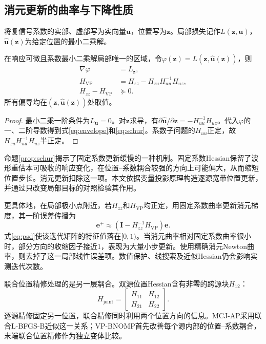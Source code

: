 \subsection{消元更新的曲率与下降性质}\label{sec:curvature}
将复信号系数的实部、虚部写为实向量$\bm u$，位置写为$\bm z$。局部损失记作$L(\bm z,\bm u)$，$\widehat{\bm u}(\bm z)$为给定位置的最小二乘解。
\begin{proposition}[消元曲率]\label{prop:schur}
在响应可微且系数最小二乘解局部唯一的区域，令$\varphi(\bm z)=L(\bm z,\widehat{\bm u}(\bm z))$，则
\begin{align}
 \nabla\varphi&=L_{\bm z},\label{eq:envelope}\\
 H_{\mathrm{VP}}&=H_{zz}-H_{zu}H_{uu}^{-1}H_{uz},\label{eq:schur}\\
 H_{zz}-H_{\mathrm{VP}}&\succeq0 .\label{eq:psd}
\end{align}
所有偏导均在$(\bm z,\widehat{\bm u}(\bm z))$处取值。
\end{proposition}
\begin{proof}
最小二乘一阶条件为$L_{\bm u}=0$。对$\bm z$求导，有$\partial\widehat{\bm u}/\partial\bm z=-H_{uu}^{-1}H_{uz}$。代入$\varphi$的一、二阶导数得到式\eqref{eq:envelope}和\eqref{eq:schur}。系数子问题的$H_{uu}$正定，故$H_{zu}H_{uu}^{-1}H_{uz}$半正定。
\end{proof}

命题\ref{prop:schur}揭示了固定系数更新缓慢的一种机制。固定系数Hessian保留了波形重估本可吸收的响应变化，在位置--系数耦合较强的方向上可能偏大，从而缩短位置步长。消元更新扣除这一项。本文依据变量投影原理\cite{GolubPereyra1973}构造逐源宽带位置更新，并通过只改变局部目标的对照检验其作用。

更具体地，在局部极小点附近，若$H_{zz}$和$H_{\mathrm{VP}}$均正定，用固定系数曲率更新消元梯度，其一阶误差传播为
\begin{equation}
 \bm e^{+}\approx
 \left(\bm I-H_{zz}^{-1}H_{\mathrm{VP}}\right)\bm e .\label{eq:localrate}
\end{equation}
式\eqref{eq:psd}使该迭代矩阵的特征值落在$[0,1)$。当消元曲率相对固定系数曲率很小时，部分方向的收缩因子接近1，表现为大量小步更新。使用精确消元Newton曲率，则去掉了这一局部线性误差项。数值保护、线搜索及近似Hessian仍会影响实测迭代次数。

联合位置精修处理的是另一层耦合。双源位置Hessian含有非零的跨源块$H_{12}$：
\begin{equation}
 H_{\mathrm{joint}}=
 \begin{bmatrix}H_{11}&H_{12}\\H_{21}&H_{22}\end{bmatrix} .
\end{equation}
逐源精修固定另一位置，联合精修同时利用两个位置方向的信息。MCJ-AP采用联合L-BFGS-B近似这一关系；VP-BNOMP首先改善每个源内部的位置--系数耦合，末端联合位置精修作为独立变体比较。

